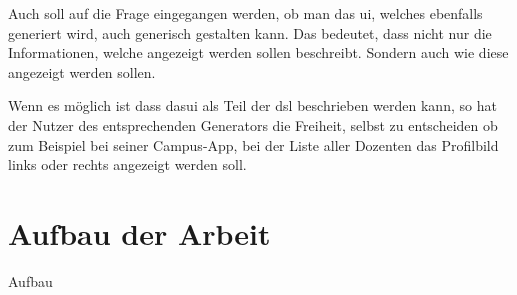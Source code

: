 Auch soll auf die Frage eingegangen werden, ob man das \ac{ui}, welches ebenfalls generiert wird, auch generisch gestalten kann. Das bedeutet, dass nicht nur die Informationen, welche angezeigt werden sollen beschreibt. Sondern auch wie diese angezeigt werden sollen.

Wenn es möglich ist dass das\ac{ui} als Teil der \ac{dsl} beschrieben werden kann, so hat der Nutzer des entsprechenden Generators die Freiheit, selbst zu entscheiden ob zum Beispiel bei seiner Campus-App, bei der Liste aller Dozenten das Profilbild links oder rechts angezeigt werden soll.

\section{Aufbau der Arbeit}\label{sec:structure}
Aufbau